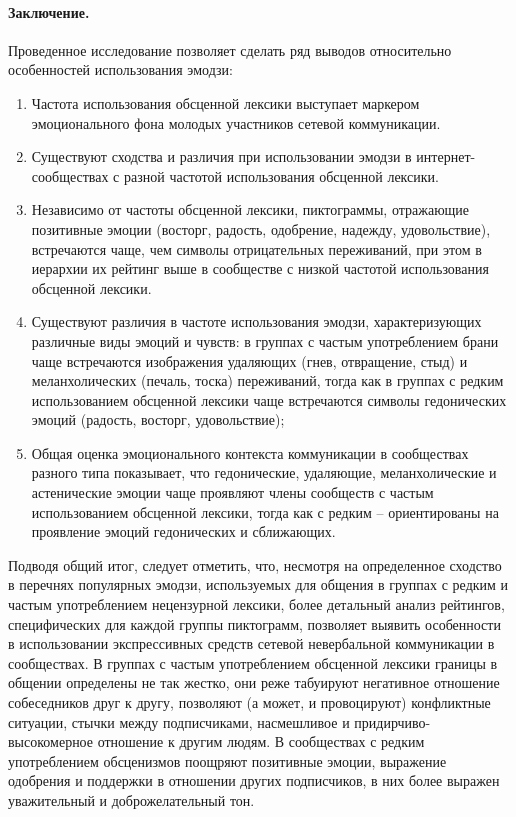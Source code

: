 \paragraph{Заключение.} Проведенное исследование позволяет сделать ряд выводов относительно особенностей использования эмодзи:
\begin{enumerate}
	\item Частота использования обсценной лексики выступает маркером эмоционального фона молодых участников сетевой коммуникации.
	\item Существуют сходства и различия при использовании эмодзи в интернет-сообществах с разной частотой использования обсценной лексики.
	\item Независимо от частоты обсценной лексики, пиктограммы, отражающие позитивные эмоции (восторг, радость, одобрение, надежду, удовольствие), встречаются чаще, чем символы отрицательных переживаний, при этом в иерархии их рейтинг выше в сообществе с низкой частотой использования обсценной лексики.
	\item Существуют различия в частоте использования эмодзи, характеризующих различные виды эмоций и чувств: в группах с частым употреблением брани чаще встречаются изображения удаляющих (гнев, отвращение, стыд) и меланхолических (печаль, тоска) переживаний, тогда как в группах с редким использованием обсценной лексики чаще встречаются символы гедонических эмоций (радость, восторг, удовольствие);
	\item Общая оценка эмоционального контекста коммуникации в сообществах разного типа показывает, что гедонические, удаляющие, меланхолические и астенические эмоции чаще проявляют члены сообществ с частым использованием обсценной лексики, тогда как с редким – ориентированы на проявление эмоций гедонических и сближающих.
\end{enumerate}

Подводя общий итог, следует отметить, что, несмотря на определенное сходство в перечнях популярных эмодзи, используемых для общения в группах с редким и частым употреблением нецензурной лексики, более детальный анализ рейтингов, специфических для каждой группы пиктограмм, позволяет выявить особенности в использовании экспрессивных средств сетевой невербальной коммуникации в сообществах. В группах с частым употреблением обсценной лексики границы в общении определены не так жестко, они реже табуируют негативное отношение собеседников друг к другу, позволяют (а может, и провоцируют) конфликтные ситуации, стычки между подписчиками, насмешливое и придирчиво-высокомерное отношение к другим людям. В сообществах с редким употреблением обсценизмов поощряют позитивные эмоции, выражение одобрения и поддержки в отношении других подписчиков, в них более выражен уважительный и доброжелательный тон.


